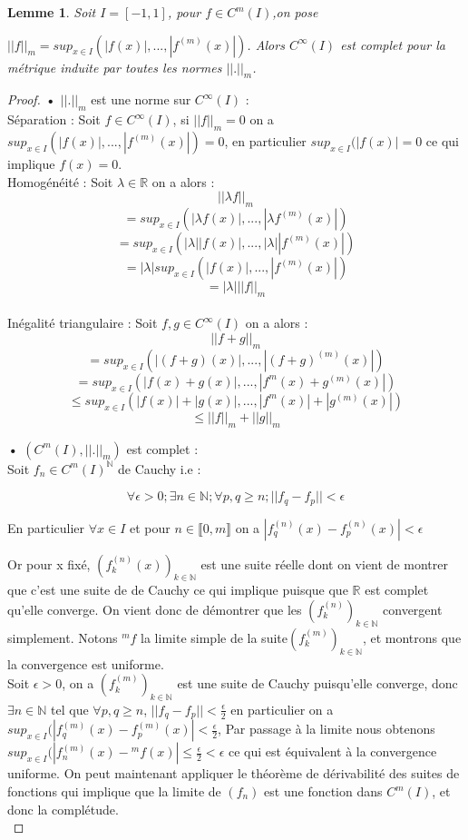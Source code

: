 \documentclass[12pt,a4paper]{amsart}
\newtheorem{lem}[thm]{\bf Lemme}
\begin{document}
\begin{lem} Soit $I=[-1,1]$, pour $f \in C^{m}(I)$,on pose

 $||f||_{m}=sup_{x\in I}(|f(x)|,..., |f^{(m)}(x)|)$. Alors $C^{\infty}(I)$ est complet pour la métrique induite par toutes les normes $||.||_{m}$. 
\end{lem}
\begin{proof}
\textbf{•} $||.||_{m}$ est une norme sur $C^{\infty}(I)$ : \\

Séparation : Soit $f\in C^{\infty}(I)$, si $||f||_{m} =0$ on a $sup_{x\in I}(|f(x)|,..., |f^{(m)}(x)|)=0$, en particulier  $sup_{x\in I}(|f(x)|=0$ ce qui implique $f(x)=0$. \\

Homogénéité : Soit $\lambda \in \mathbb{R}$ on a alors : 
$$||\lambda f||_{m}$$
$$=sup_{x\in I}(|\lambda f(x)|,..., |\lambda f^{(m)}(x)|)$$
$$=sup_{x\in I}(|\lambda| |f(x)|,..., |\lambda| |f^{(m)}(x)|)$$
$$=|\lambda| sup_{x\in I}(|f(x)|,..., |f^{(m)}(x)|)$$
$$=|\lambda| ||f||_{m}$$\\

Inégalité triangulaire : Soit $f,g \in C^{\infty}(I)$ on a alors : 
$$ ||f+g||_{m}$$
$$=sup_{x\in I}(|(f+g)(x)|,..., | (f+g)^{(m)}(x)|)$$
$$=sup_{x\in I}(|f(x)+g(x)|,..., | f^{m}(x)+g^{(m)}(x)|)$$
$$\leq sup_{x\in I}(|f(x)|+|g(x)|,..., | f^{m}(x)|+|g^{(m)}(x)|)$$
$$\leq ||f||_{m}+ ||g||_{m}$$

\textbf{•} $(C^{m}(I),||.||_{m})$ est complet : \\

Soit $f_{n} \in C^{m}(I)^{\mathbb{N}}$ de Cauchy i.e : 

$$ \forall \epsilon >0;  \exists n \in \mathbb{N};  \forall p,q \geq n;  ||f_{q}-f_{p}|| < \epsilon$$

En particulier $\forall x \in I$ et pour $n\in \llbracket 0,m  \rrbracket$ on a  $|f^{(n)}_{q}(x)-f^{(n)}_{p}(x)|<\epsilon$

Or pour x fixé, $(f_{k}^{(n)}(x))_{k\in \mathbb{N}}$ est une suite réelle dont on vient de montrer que c'est une suite de de Cauchy ce qui implique puisque que  $\mathbb{R}$ est complet qu'elle converge. On vient donc de démontrer que les $ (f_{k}^{(n)})_{k\in \mathbb{N}}$ convergent simplement. Notons $ ^{m}f $ la limite simple de la suite$(f_{k}^{(m)})_{k\in \mathbb{N}}$, et montrons que la convergence est uniforme.\\ 

Soit $\epsilon >0$, on a $(f_{k}^{(m)})_{k\in \mathbb{N}}$ est une suite de Cauchy puisqu'elle converge, donc $\exists n \in \mathbb{N}$ tel que $\forall p, q\geq n $, $ ||f_{q}-f_{p}|| < \frac{\epsilon}{2}$  en particulier on a $sup_{x\in I}(|f^{(m)}_{q}(x)-f^{(m)}_{p}(x)|< \frac{\epsilon}{2}$, Par passage à la limite nous obtenons $sup_{x\in I}(|f^{(m)}_{n}(x)- {}^{m}f(x)|\leq \frac{\epsilon}{2} < \epsilon$ ce qui est équivalent à la convergence uniforme. On peut maintenant appliquer le théorème de dérivabilité des suites de fonctions qui implique que la limite de $(f_{n})$ est une fonction dans $C^{m}(I)$, et donc la complétude.\\


\end{proof}
\end{document}
